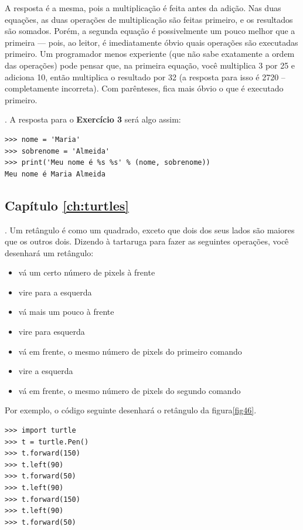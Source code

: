 \noindent
A resposta é a mesma, pois a multiplicação é feita antes da adição. Nas duas equações, as duas operações de multiplicação são feitas primeiro, e os resultados são somados. Porém, a segunda equação é possivelmente um pouco melhor que a primeira --- pois, ao leitor, é imediatamente óbvio quais operações são executadas primeiro. Um programador menos experiente (que não sabe exatamente a ordem das operações) pode pensar que, na primeira equação, você multiplica 3 por 25 e adiciona 10, então multiplica o resultado por 32 (a resposta para isso é 2720 -- completamente incorreta). Com parênteses, fica mais óbvio o que é executado primeiro.

. A resposta para o \textbf{Exercício 3} será algo assim:

\begin{listing}
\begin{verbatim}
>>> nome = 'Maria'
>>> sobrenome = 'Almeida'
>>> print('Meu nome é %s %s' % (nome, sobrenome))
Meu nome é Maria Almeida
\end{verbatim}
\end{listing}

\subsection*{Capítulo \ref{ch:turtles}}

. Um retângulo é como um quadrado, exceto que dois dos seus lados são maiores que os outros dois. Dizendo à tartaruga para fazer as seguintes operações, você desenhará um retângulo:

\begin{itemize}
 \item vá um certo número de pixels à frente
 \item vire para a esquerda
 \item vá mais um pouco à frente
 \item vire para esquerda
 \item vá em frente, o mesmo número de pixels do primeiro comando
 \item vire a esquerda
 \item vá em frente, o mesmo número de pixels do segundo comando
\end{itemize}

\noindent
Por exemplo, o código seguinte desenhará o retângulo da figura\ref{fig46}.

\begin{listing}
\begin{verbatim}
>>> import turtle
>>> t = turtle.Pen()
>>> t.forward(150)
>>> t.left(90)
>>> t.forward(50)
>>> t.left(90)
>>> t.forward(150)
>>> t.left(90)
>>> t.forward(50)
\end{verbatim}
\end{listing}

